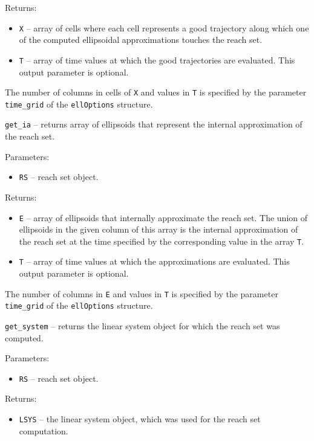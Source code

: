 Returns:
\begin{itemize}
\item {\tt X} -- array of cells where each cell represents a good trajectory
along which one of the computed ellipsoidal approximations touches the
reach set.
\item {\tt T} -- array of time values at which the good trajectories
are evaluated. This output parameter is optional.
\end{itemize}
The number of columns in cells of {\tt X} and values in {\tt T} is specified by
the parameter {\tt time\_grid} of the {\tt ellOptions} structure.

\newpage

{\Large {\tt get\_ia}} -- returns array of ellipsoids that represent the
internal approximation of the reach set.

Parameters:
\begin{itemize}
\item {\tt RS} -- reach set object.
\end{itemize}

Returns:
\begin{itemize}
\item {\tt E} -- array of ellipsoids that internally approximate the reach set.
The union of ellipsoids in the given column of this array is
the internal approximation of the reach set at the time specified by the
corresponding value in the array {\tt T}.
\item {\tt T} -- array of time values at which the approximations
are evaluated. This output parameter is optional.
\end{itemize}
The number of columns in {\tt E} and values in {\tt T} is specified by
the parameter {\tt time\_grid} of the {\tt ellOptions} structure.

\newpage

{\Large {\tt get\_system}} -- returns the linear system object for which
the reach set was computed.

Parameters:
\begin{itemize}
\item {\tt RS} -- reach set object.
\end{itemize}

Returns:
\begin{itemize}
\item {\tt LSYS} -- the linear system object, which was used for the reach
set computation.
\end{itemize}

\newpage


